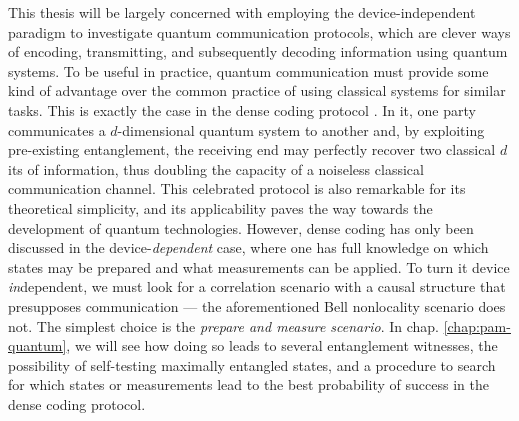 This thesis will be largely concerned with employing the device-independent paradigm to investigate quantum communication protocols, which are clever ways of encoding, transmitting, and subsequently decoding information using quantum systems. To be useful in practice, quantum communication must provide some kind of advantage over the common practice of using classical systems for similar tasks. This is exactly the case in the dense coding protocol \cite{bennett_1992_superdense}. In it, one party communicates a $d$-dimensional quantum system to another and, by exploiting pre-existing entanglement, the receiving end may perfectly recover two classical $d$its of information, thus doubling the capacity of a noiseless classical communication channel. This celebrated protocol is also remarkable for its theoretical simplicity, and its applicability paves the way towards the development of quantum technologies. However, dense coding has only been discussed in the device-\emph{dependent} case, where one has full knowledge on which states may be prepared and what measurements can be applied. To turn it device \emph{in}dependent, we must look for a correlation scenario with a causal structure that presupposes communication --- the aforementioned Bell nonlocality scenario does not. The simplest choice is the \emph{prepare and measure scenario}. In chap. \ref{chap:pam-quantum}, we will see how doing so leads to several entanglement witnesses, the possibility of self-testing maximally entangled states, and a procedure to search for which states or measurements lead to the best probability of success in the dense coding protocol.

